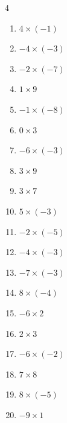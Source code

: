 \begin{multicols}{4}
\begin{enumerate}
  \item $4\times (-1)$
        \phantom{$=-4$}

  \item $-4\times (-3)$
        \phantom{$=12$}

  \item $-2\times (-7)$
        \phantom{$=14$}

  \item $1\times 9$
        \phantom{$=9$}

  \item $-1\times (-8)$
        \phantom{$=8$}

  \item $0\times 3$
        \phantom{$=0$}

  \item $-6\times (-3)$
        \phantom{$=18$}

  \item $3\times 9$
        \phantom{$=27$}

  \item $3\times 7$
        \phantom{$=21$}

  \item $5\times (-3)$
        \phantom{$=-15$}

  \item $-2\times (-5)$
        \phantom{$=10$}

  \item $-4\times (-3)$
        \phantom{$=12$}

  \item $-7\times (-3)$
        \phantom{$=21$}

\columnbreak %

  \item $8\times (-4)$
        \phantom{$=-32$}

  \item $-6\times 2$
        \phantom{$=-12$}

  \item $2\times 3$
        \phantom{$=6$}

  \item $-6\times (-2)$
        \phantom{$=12$}

  \item $7\times 8$
        \phantom{$=56$}

  \item $8\times (-5)$
        \phantom{$=-40$}

  \item $-9\times 1$
        \phantom{$=-9$}


\end{enumerate}
\end{multicols}
